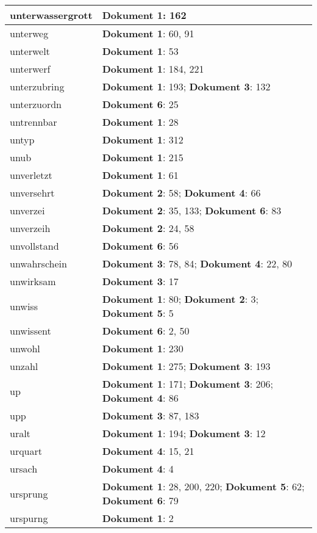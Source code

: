 \documentclass[a5paper]{article}
\begin{document}
\begin{longtable}[l]{|l|p{3in}|}
unterwassergrott & \textbf{Dokument 1}: 162 \\
\hline
unterweg & \textbf{Dokument 1}: 60, 91 \\
\hline
unterwelt & \textbf{Dokument 1}: 53 \\
\hline
unterwerf & \textbf{Dokument 1}: 184, 221 \\
\hline
unterzubring & \textbf{Dokument 1}: 193; \textbf{Dokument 3}: 132 \\
\hline
unterzuordn & \textbf{Dokument 6}: 25 \\
\hline
untrennbar & \textbf{Dokument 1}: 28 \\
\hline
untyp & \textbf{Dokument 1}: 312 \\
\hline
unub & \textbf{Dokument 1}: 215 \\
\hline
unverletzt & \textbf{Dokument 1}: 61 \\
\hline
unversehrt & \textbf{Dokument 2}: 58; \textbf{Dokument 4}: 66 \\
\hline
unverzei & \textbf{Dokument 2}: 35, 133; \textbf{Dokument 6}: 83 \\
\hline
unverzeih & \textbf{Dokument 2}: 24, 58 \\
\hline
unvollstand & \textbf{Dokument 6}: 56 \\
\hline
unwahrschein & \textbf{Dokument 3}: 78, 84; \textbf{Dokument 4}: 22, 80 \\
\hline
unwirksam & \textbf{Dokument 3}: 17 \\
\hline
unwiss & \textbf{Dokument 1}: 80; \textbf{Dokument 2}: 3; \textbf{Dokument 5}: 5 \\
\hline
unwissent & \textbf{Dokument 6}: 2, 50 \\
\hline
unwohl & \textbf{Dokument 1}: 230 \\
\hline
unzahl & \textbf{Dokument 1}: 275; \textbf{Dokument 3}: 193 \\
\hline
up & \textbf{Dokument 1}: 171; \textbf{Dokument 3}: 206; \textbf{Dokument 4}: 86 \\
\hline
upp & \textbf{Dokument 3}: 87, 183 \\
\hline
uralt & \textbf{Dokument 1}: 194; \textbf{Dokument 3}: 12 \\
\hline
urquart & \textbf{Dokument 4}: 15, 21 \\
\hline
ursach & \textbf{Dokument 4}: 4 \\
\hline
ursprung & \textbf{Dokument 1}: 28, 200, 220; \textbf{Dokument 5}: 62; \textbf{Dokument 6}: 79 \\
\hline
urspurng & \textbf{Dokument 1}: 2 \\

\end{longtable}
\end{document}
